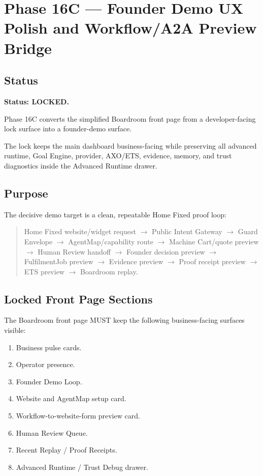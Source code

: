 \section{Phase 16C --- Founder Demo UX Polish and Workflow/A2A Preview Bridge}
\label{sec:aion-phase16c-founder-demo-ux-polish-lock}

\subsection{Status}

\textbf{Status: LOCKED.}

Phase 16C converts the simplified Boardroom front page from a developer-facing
lock surface into a founder-demo surface.

The lock keeps the main dashboard business-facing while preserving all advanced
runtime, Goal Engine, provider, AXO/ETS, evidence, memory, and trust diagnostics
inside the Advanced Runtime drawer.

\subsection{Purpose}

The decisive demo target is a clean, repeatable Home Fixed proof loop:

\begin{quote}
Home Fixed website/widget request
$\rightarrow$ Public Intent Gateway
$\rightarrow$ Guard Envelope
$\rightarrow$ AgentMap/capability route
$\rightarrow$ Machine Cart/quote preview
$\rightarrow$ Human Review handoff
$\rightarrow$ Founder decision preview
$\rightarrow$ FulfilmentJob preview
$\rightarrow$ Evidence preview
$\rightarrow$ Proof receipt preview
$\rightarrow$ ETS preview
$\rightarrow$ Boardroom replay.
\end{quote}

\subsection{Locked Front Page Sections}

The Boardroom front page MUST keep the following business-facing surfaces visible:

\begin{enumerate}
  \item Business pulse cards.
  \item Operator presence.
  \item Founder Demo Loop.
  \item Website and AgentMap setup card.
  \item Workflow-to-website-form preview card.
  \item Human Review Queue.
  \item Recent Replay / Proof Receipts.
  \item Advanced Runtime / Trust Debug drawer.
\end{enumerate}

